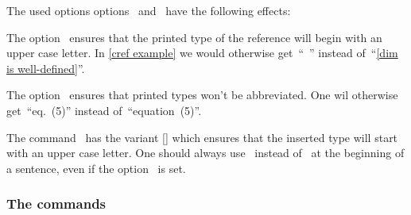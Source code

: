 The used options options~ and~ have the following effects:
\begin{myitemize}
  \item
    The option~ ensures that the printed type of the reference will begin with an upper case letter.
    In \cref{cref example} we would otherwise get~\enquote{~} instead of~\enquote{\cref{dim is well-defined}}.
  \item
    The option~ ensures that printed types won’t be abbreviated.
    One wil otherwise get~\enquote{eq.\ (5)} instead of~\enquote{equation~(5)}.
\end{myitemize}

The command~ has the variant [\comname] which ensures that the inserted type will start with an upper case letter.
One should always use~ instead of~ at the beginning of a sentence, even if the option~ is set.

\subsubsection{The commands~}

